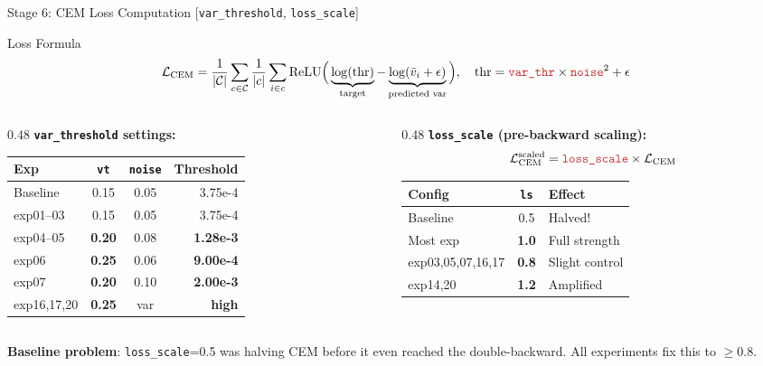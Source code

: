 \documentclass[aspectratio=169, 10pt]{beamer}
\newcommand{\param}[1]{\textcolor{paramred}{\texttt{#1}}}
\newcommand{\warn}[1]{\textcolor{warnorg}{#1}}
\begin{document}
\begin{frame}{Stage 6: CEM Loss Computation \quad\small[\param{var\_threshold}, \param{loss\_scale}]}

\begin{block}{Loss Formula}
\vspace{-0.3cm}
$$\mathcal{L}_{\text{CEM}} = \frac{1}{|\mathcal{C}|}\sum_{c \in \mathcal{C}} \frac{1}{|c|} \sum_{i \in c} \text{ReLU}\Big(\underbrace{\log(\text{thr})}_{\text{target}} - \underbrace{\log(\bar{v}_i + \epsilon)}_{\text{predicted var}}\Big), \quad \text{thr} = \param{var\_thr} \times \param{noise}^2 + \epsilon$$
\end{block}

\vspace{-0.1cm}
\begin{columns}[T]
\begin{column}{0.48\textwidth}
\textbf{\param{var\_threshold} settings:}
\begin{center}
\small
\begin{tabular}{lccr}
\toprule
Exp & \param{vt} & \param{noise} & Threshold \\
\midrule
Baseline & 0.15 & 0.05 & 3.75e-4 \\
exp01--03 & 0.15 & 0.05 & 3.75e-4 \\
exp04--05 & \textbf{0.20} & 0.08 & \textbf{1.28e-3} \\
exp06 & \textbf{0.25} & 0.06 & \textbf{9.00e-4} \\
exp07 & \textbf{0.20} & 0.10 & \textbf{2.00e-3} \\
exp16,17,20 & \textbf{0.25} & var & \textbf{high} \\
\bottomrule
\end{tabular}
\end{center}
\end{column}
\begin{column}{0.48\textwidth}
\textbf{\param{loss\_scale} (pre-backward scaling):}
$$\mathcal{L}_{\text{CEM}}^{\text{scaled}} = \param{loss\_scale} \times \mathcal{L}_{\text{CEM}}$$

\begin{center}
\small
\begin{tabular}{lcl}
\toprule
Config & \param{ls} & Effect \\
\midrule
Baseline & 0.5 & \warn{Halved!} \\
Most exp & \textbf{1.0} & Full strength \\
exp03,05,07,16,17 & \textbf{0.8} & Slight control \\
exp14,20 & \textbf{1.2} & Amplified \\
\bottomrule
\end{tabular}
\end{center}
\end{column}
\end{columns}

\vspace{0.2cm}
\small
\textbf{Baseline problem}: \param{loss\_scale}=0.5 was halving CEM before it even reached the double-backward. All experiments fix this to $\geq 0.8$.

\end{frame}
\end{document}
